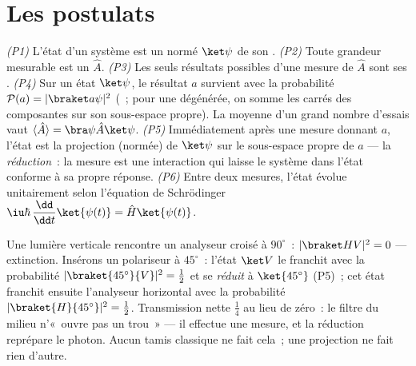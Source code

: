 \section{Les postulats}

\begin{theorem}\label{thm:b3:quantum-formalism:postulates}
\emph{(P1)} L'état d'un système est un  normé $\ket\psi$ de son
.
\emph{(P2)} Toute grandeur mesurable est un 
$\hat A$.
\emph{(P3)} Les seuls résultats possibles d'une mesure de $\hat A$
sont ses .
\emph{(P4)} Sur un état $\ket\psi$, le résultat $a$ survient avec la
probabilité $\mathcal P(a) = |\braket a\psi|^2$ (~; pour
une  dégénérée, on somme les carrés des composantes sur
son sous-espace propre). La moyenne d'un grand nombre d'essais vaut $\langle\hat A\rangle =
\bra\psi\hat A\ket\psi$.
\emph{(P5)} Immédiatement après une mesure donnant $a$, l'état est la
projection (normée) de $\ket\psi$ sur le sous-espace propre de $a$ ---
la \emph{réduction}~: la mesure est une interaction qui laisse le
système dans l'état conforme à sa propre réponse.
\emph{(P6)} Entre deux mesures, l'état évolue unitairement selon
l'équation de Schrödinger
$\iu\hbar\,\dfrac{\dd}{\dd t}\ket{\psi(t)} = \hat H\ket{\psi(t)}$.
\end{theorem}
\admitted

\begin{example}\label{ex:b3:quantum-formalism:threepolarizers}
Une lumière verticale rencontre un analyseur croisé à $90^\circ$~: $|\braket
HV|^2 = 0$ --- extinction. Insérons un polariseur à $45^\circ$~: l'état
$\ket V$ le franchit avec la probabilité $|\braket{45^\circ}{V}|^2 =
\tfrac12$ et se \emph{réduit} à $\ket{45^\circ}$ (P5)~; cet état
franchit ensuite l'analyseur horizontal avec la probabilité
$|\braket{H}{45^\circ}|^2 = \tfrac12$. Transmission nette $\tfrac14$
au lieu de zéro~: le filtre du milieu n'«~ouvre pas un trou~» --- il
effectue une mesure, et la réduction reprépare le photon. Aucun tamis
classique ne fait cela~; une projection ne fait rien d'autre.
\end{example}

